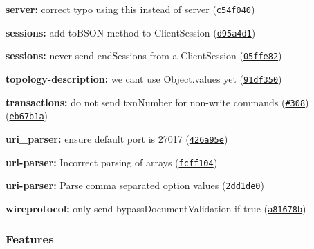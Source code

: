 \begin{DoxyItemize}
\item {\bfseries server\+:} correct typo using {\ttfamily this} instead of {\ttfamily server} (\href{https://github.com/mongodb-js/mongodb-core/commit/c54f040}{\tt c54f040})
\item {\bfseries sessions\+:} add {\ttfamily to\+B\+S\+ON} method to {\ttfamily Client\+Session} (\href{https://github.com/mongodb-js/mongodb-core/commit/d95a4d1}{\tt d95a4d1})
\item {\bfseries sessions\+:} never send {\ttfamily end\+Sessions} from a {\ttfamily Client\+Session} (\href{https://github.com/mongodb-js/mongodb-core/commit/05ffe82}{\tt 05ffe82})
\item {\bfseries topology-\/description\+:} we can\textquotesingle{}t use Object.\+values yet (\href{https://github.com/mongodb-js/mongodb-core/commit/91df350}{\tt 91df350})
\item {\bfseries transactions\+:} do not send txn\+Number for non-\/write commands (\href{https://github.com/mongodb-js/mongodb-core/issues/308}{\tt \#308}) (\href{https://github.com/mongodb-js/mongodb-core/commit/eb67b1a}{\tt eb67b1a})
\item {\bfseries uri\+\_\+parser\+:} ensure default port is 27017 (\href{https://github.com/mongodb-js/mongodb-core/commit/426a95e}{\tt 426a95e})
\item {\bfseries uri-\/parser\+:} Incorrect parsing of arrays (\href{https://github.com/mongodb-js/mongodb-core/commit/fcff104}{\tt fcff104})
\item {\bfseries uri-\/parser\+:} Parse comma separated option values (\href{https://github.com/mongodb-js/mongodb-core/commit/2dd1de0}{\tt 2dd1de0})
\item {\bfseries wireprotocol\+:} only send bypass\+Document\+Validation if true (\href{https://github.com/mongodb-js/mongodb-core/commit/a81678b}{\tt a81678b})
\end{DoxyItemize}

\subsubsection*{Features}


